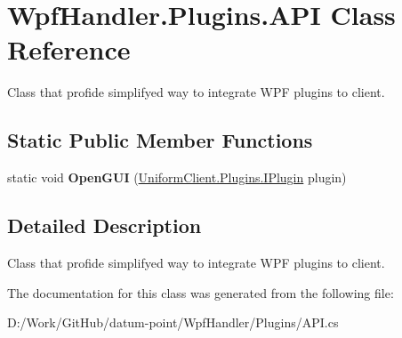 \hypertarget{class_wpf_handler_1_1_plugins_1_1_a_p_i}{}\section{Wpf\+Handler.\+Plugins.\+A\+PI Class Reference}
\label{class_wpf_handler_1_1_plugins_1_1_a_p_i}


Class that profide simplifyed way to integrate W\+PF plugins to client.  


\subsection*{Static Public Member Functions}
\begin{DoxyCompactItemize}
\item 
\mbox{\label{class_wpf_handler_1_1_plugins_1_1_a_p_i_ab5fa2212cf7d00290d86c0aa5bc65f91}} 
static void {\bfseries Open\+G\+UI} (\mbox{\hyperlink{interface_uniform_client_1_1_plugins_1_1_i_plugin}{Uniform\+Client.\+Plugins.\+I\+Plugin}} plugin)
\end{DoxyCompactItemize}


\subsection{Detailed Description}
Class that profide simplifyed way to integrate W\+PF plugins to client. 



The documentation for this class was generated from the following file\+:\begin{DoxyCompactItemize}
\item 
D\+:/\+Work/\+Git\+Hub/datum-\/point/\+Wpf\+Handler/\+Plugins/A\+P\+I.\+cs\end{DoxyCompactItemize}
